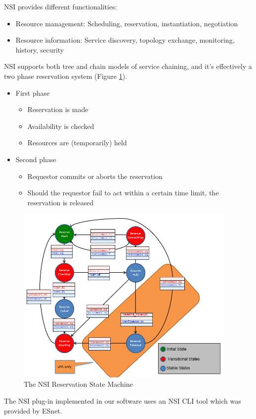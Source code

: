 NSI provides different functionalities:
\begin{itemize}
  \item Resource management: Scheduling, reservation, instantiation, negotiation
  \item Resource information: Service discovery, topology exchange, monitoring, history, security
\end{itemize}

NSI\cite{NSI-CS2} supports both tree and chain models of service chaining, and it's effectively a two 
phase reservation system (Figure \ref{fig:NSI_RSM}).

\begin{itemize}
  \item First phase
	\begin{itemize}
		\item Reservation is made
		\item Availability is checked
		\item Resources are (temporarily) held
	\end{itemize}
  \item Second phase
	\begin{itemize}
		\item Requestor commits or aborts the reservation
		\item Should the requestor fail to act within a certain time limit, the reservation is released
	\end{itemize}
\end{itemize}

\begin{figure}[h]
  \centering
  \includegraphics[width=0.95\textwidth]{Figures/NSI_RSM.png}
  \caption{The NSI Reservation State Machine}
  \label{fig:NSI_RSM}
\end{figure} 

The NSI plug-in implemented in our software uses an NSI CLI tool which was provided by ESnet.
